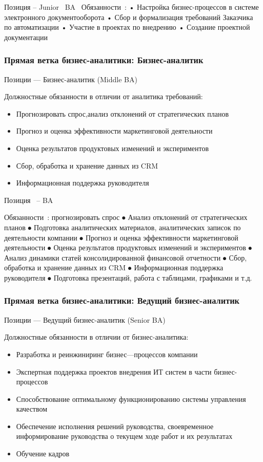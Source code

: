 \documentclass{../industrial-development}
\begin{document}
{\lecturenotes
Позиция – Junior~\cite{hh} BA~\cite{itcf}
Обязанности~\cite{rab}:
•	Настройка бизнес-процессов в системе электронного документооборота 
•	Сбор и формализация требований Заказчика по автоматизации 
•	Участие в проектах по внедрению 
•	Создание проектной документации


\begin{frame} \frametitle{Прямая ветка бизнес-аналитики: Бизнес-аналитик}
  \begin{block}{}
  \alert{Позиции --- Бизнес-аналитик (Middle  BA) }

Должностные обязанности в отличии от аналитика требований: 
  \end{block}
  \begin{itemize}
  \item  Прогнозировать спрос,анализ отклонений от стратегических планов
  \item   Прогноз и оценка эффективности маркетинговой деятельности
  \item Оценка результатов продуктовых изменений и экспериментов
 \item  Сбор, обработка и хранение данных из CRM
 \item  Информационная поддержка руководителя
  \end{itemize}
\end{frame}


\lecturenotes
Позиция~\cite{hh} –  BA~\cite{itcf}

Обязанности~\cite{rab}:
	прогнозировать спрос 
⦁ Анализ отклонений от стратегических планов
⦁ Подготовка аналитических материалов, аналитических записок по деятельности компании
⦁ Прогноз и оценка эффективности маркетинговой деятельности
⦁ Оценка результатов продуктовых изменений и экспериментов
⦁ Анализ динамики статей консолидированной финансовой отчетности
⦁ Сбор, обработка и хранение данных из CRM
⦁ Информационная поддержка руководителя
⦁ Подготовка презентаций, работа с таблицами, графиками и т.д.


\begin{frame} \frametitle{Прямая ветка бизнес-аналитики: Ведущий бизнес-аналитик}
  \begin{block}{}
  \alert{Позиции --- Ведущий бизнес-аналитик (Senior  BA) }

Должностные обязанности в отличии от бизнес-аналитика: 
  \end{block}
  \begin{itemize}
  \item  Разработка и реинжиниринг бизнес---процессов компании
  \item   Экспертная поддержка проектов внедрения ИТ систем в части бизнес-процессов
  \item Способствование оптимальному функционированию системы управления качеством
 \item  Обеспечение исполнения решений руководства, своевременное информирование руководства о текущем ходе работ и их результатах
 \item  Обучение кадров
  \end{itemize}
\end{frame}


}
\end{document}
